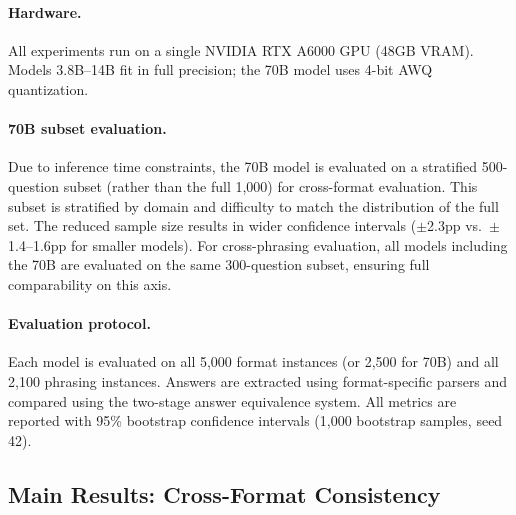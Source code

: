 \documentclass{article}
\begin{document}
\paragraph{Hardware.} All experiments run on a single NVIDIA RTX A6000 GPU (48GB VRAM). Models 3.8B--14B fit in full precision; the 70B model uses 4-bit AWQ quantization.

\paragraph{70B subset evaluation.} Due to inference time constraints, the 70B model is evaluated on a stratified 500-question subset (rather than the full 1,000) for cross-format evaluation. This subset is stratified by domain and difficulty to match the distribution of the full set. The reduced sample size results in wider confidence intervals ($\pm$2.3pp vs.\ $\pm$1.4--1.6pp for smaller models). For cross-phrasing evaluation, all models including the 70B are evaluated on the same 300-question subset, ensuring full comparability on this axis.

\paragraph{Evaluation protocol.} Each model is evaluated on all 5,000 format instances (or 2,500 for 70B) and all 2,100 phrasing instances. Answers are extracted using format-specific parsers and compared using the two-stage answer equivalence system. All metrics are reported with 95\% bootstrap confidence intervals (1,000 bootstrap samples, seed 42).

\subsection{Main Results: Cross-Format Consistency}
\end{document}
